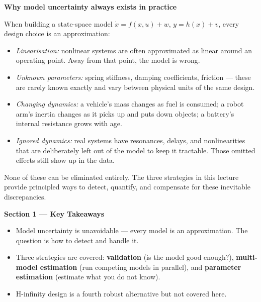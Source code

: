 \documentclass[12pt, a4paper]{article}
\begin{document}
\begin{notebox}
  \textbf{Why model uncertainty always exists in practice}

  When building a state-space model $\dot{x} = f(x,u) + w$,
  $y = h(x) + v$, every design choice is an approximation:

  \begin{itemize}[leftmargin=1.5em, itemsep=2pt]
    \item \emph{Linearisation:} nonlinear systems are often approximated
      as linear around an operating point.
      Away from that point, the model is wrong.
    \item \emph{Unknown parameters:} spring stiffness, damping
      coefficients, friction --- these are rarely known exactly and vary
      between physical units of the same design.
    \item \emph{Changing dynamics:} a vehicle's mass changes as fuel is
      consumed; a robot arm's inertia changes as it picks up and puts down
      objects; a battery's internal resistance grows with age.
    \item \emph{Ignored dynamics:} real systems have resonances, delays,
      and nonlinearities that are deliberately left out of the model to
      keep it tractable.
      Those omitted effects still show up in the data.
  \end{itemize}

  None of these can be eliminated entirely.
  The three strategies in this lecture provide principled ways to detect,
  quantify, and compensate for these inevitable discrepancies.
\end{notebox}

\begin{keybox}
  \textbf{Section 1 --- Key Takeaways}
  \begin{itemize}[leftmargin=1.2em, itemsep=2pt]
    \item Model uncertainty is unavoidable --- every model is an
      approximation.
      The question is how to detect and handle it.
    \item Three strategies are covered: \textbf{validation} (is the model
      good enough?), \textbf{multi-model estimation} (run competing
      models in parallel), and \textbf{parameter estimation} (estimate
      what you do not know).
    \item H-infinity design is a fourth robust alternative but not covered
      here.
  \end{itemize}
\end{keybox}
\end{document}

